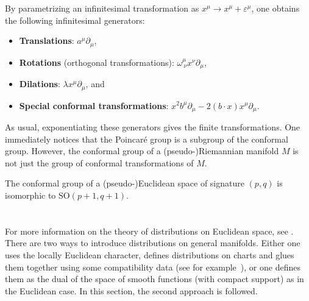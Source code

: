     By parametrizing an infinitesimal transformation as $x^\mu\rightarrow x^\mu+\varepsilon^\mu$, one obtains the following infinitesimal generators:
    \begin{itemize}
        \item\textbf{Translations}: $a^\mu\partial_\mu$,
        \item\textbf{Rotations} (orthogonal transformations): $\omega^\mu_{\ \nu}x^\nu\partial_\mu$,
        \item\textbf{Dilations}: $\lambda x^\mu\partial_\mu$, and
        \item\textbf{Special conformal transformations}: $x^2b^\mu\partial_\mu - 2(b\cdot x)x^\mu\partial_\mu$.
    \end{itemize}
    As usual, exponentiating these generators gives the finite transformations. One immediately notices that the Poincar\'e group is a subgroup of the conformal group. However, the conformal group of a (pseudo-)Riemannian manifold $M$ is not just the group of conformal transformations of $M$.
    \begin{property}\label{riemann:conformal_group}
        The conformal group of a (pseudo-)Euclidean space of signature $(p,q)$ is isomorphic to $\mathrm{SO}(p+1,q+1)$.
    \end{property}

\section{}

    For more information on the theory of distributions on Euclidean space, see . There are two ways to introduce distributions on general manifolds. Either one uses the locally Euclidean character, defines distributions on charts and glues them together using some compatibility data (see for example~\citet{choquet-bruhat_analysis_1991}), or one defines them as the dual of the space of smooth functions (with compact support) as in the Euclidean case. In this section, the second approach is followed.

